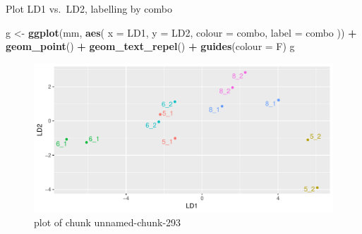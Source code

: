 \documentclass[ignorenonframetext,]{beamer}
\newenvironment{Shaded}{\begin{snugshade}}{\end{snugshade}}
\newcommand{\DataTypeTok}[1]{\textcolor[rgb]{0.13,0.29,0.53}{#1}}
\newcommand{\KeywordTok}[1]{\textcolor[rgb]{0.13,0.29,0.53}{\textbf{#1}}}
\newcommand{\NormalTok}[1]{#1}
\newcommand{\OperatorTok}[1]{\textcolor[rgb]{0.81,0.36,0.00}{\textbf{#1}}}
\newcommand{\StringTok}[1]{\textcolor[rgb]{0.31,0.60,0.02}{#1}}
\begin{document}
\begin{frame}[fragile]{Plot LD1 vs.~LD2, labelling by combo}
\protect\hypertarget{plot-ld1-vs.ld2-labelling-by-combo}{}

\begin{Shaded}
\begin{Highlighting}[]
\NormalTok{g <-}\StringTok{ }\KeywordTok{ggplot}\NormalTok{(mm, }\KeywordTok{aes}\NormalTok{(}
  \DataTypeTok{x =}\NormalTok{ LD1, }\DataTypeTok{y =}\NormalTok{ LD2, }\DataTypeTok{colour =}\NormalTok{ combo,}
  \DataTypeTok{label =}\NormalTok{ combo}
\NormalTok{)) }\OperatorTok{+}\StringTok{ }\KeywordTok{geom_point}\NormalTok{() }\OperatorTok{+}
\StringTok{  }\KeywordTok{geom_text_repel}\NormalTok{() }\OperatorTok{+}\StringTok{ }\KeywordTok{guides}\NormalTok{(}\DataTypeTok{colour =}\NormalTok{ F)}
\NormalTok{g}
\end{Highlighting}
\end{Shaded}

\begin{figure}
\centering
\includegraphics{figure/unnamed-chunk-293-1.pdf}
\caption{plot of chunk unnamed-chunk-293}
\end{figure}

\end{frame}
\end{document}
